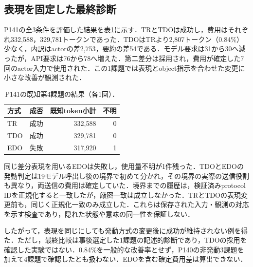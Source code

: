 \subsection{表現を固定した最終診断}
P141の全3条件を評価した結果を表\ref{tab:p141}に示す．TRとTDOは成功し，費用はそれぞれ332,588，329,781トークンであった．TDOはTRより2,807トークン（0.84\%）少なく，内訳はactorの差2,753，要約の差54である．モデル要求は31から30へ減ったが，API要求は76から78へ増えた．第二差分は採用され，費用が確定した7回のactor入力で使用された．この1課題では表現とobject指示を合わせた変更に小さな改善が観測された．

\begin{table}[t]
\caption{P141の既知第4課題の結果（各1回）．}
\label{tab:p141}
\centering
\begin{tabular}{llrr}
\hline
方式 & 成否 & 既知token小計 & 不明\\ \hline
TR & 成功 & 332,588 & 0\\
TDO & 成功 & 329,781 & 0\\
EDO & 失敗 & 317,920 & 1\\ \hline
\end{tabular}
\end{table}

同じ差分表現を用いるEDOは失敗し，使用量不明が1件残った．TDOとEDOの発動判定は19モデル呼出し後の境界で初めて分かれ，その境界の実際の送信役割も異なり，両送信の費用は確定していた．境界までの履歴は，検証済みprotocol IDを正規化すると一致したが，厳密一致は成立しなかった．TRとTDOの表現変更前も，同じく正規化一致のみ成立した．これらは保存された入力・観測の対応を示す検査であり，隠れた状態や意味の同一性を保証しない．

したがって，表現を同じにしても発動方式の変更後に成功が維持されない例を得た．ただし，最終比較は事後選定した1課題の記述的診断であり，TDOの採用を確認した実験ではない．0.84\%を一般的な改善率とせず，P140の非発動3課題を加えて4課題で確認したとも扱わない．EDOを含む確定費用差は算出できない．
